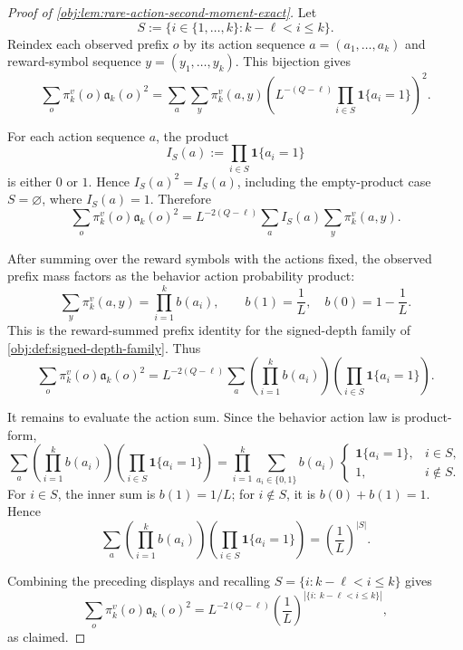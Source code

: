 \begin{proof}[Proof of \cref{obj:lem:rare-action-second-moment-exact}]
Let
\[
S:=\{i\in\{1,\ldots,k\}: k-\ell<i\le k\}.
\]
Reindex each observed prefix \(o\) by its action sequence \(a=(a_1,\ldots,a_k)\) and reward-symbol sequence \(y=(y_1,\ldots,y_k)\). This bijection gives
\[
\sum_o \pi_k^v(o)\mathfrak a_k(o)^2
=
\sum_a\sum_y
\pi_k^v(a,y)
\left(
L^{-(Q-\ell)}
\prod_{i\in S}\mathbf 1\{a_i=1\}
\right)^2 .
\]

For each action sequence \(a\), the product
\[
I_S(a):=\prod_{i\in S}\mathbf 1\{a_i=1\}
\]
is either \(0\) or \(1\). Hence \(I_S(a)^2=I_S(a)\), including the empty-product case \(S=\varnothing\), where \(I_S(a)=1\). Therefore
\[
\sum_o \pi_k^v(o)\mathfrak a_k(o)^2
=
L^{-2(Q-\ell)}
\sum_a I_S(a)\sum_y \pi_k^v(a,y).
\]

After summing over the reward symbols with the actions fixed, the observed prefix mass factors as the behavior action probability product:
\[
\sum_y \pi_k^v(a,y)
=
\prod_{i=1}^k b(a_i),
\qquad
b(1)=\frac1L,\quad b(0)=1-\frac1L .
\]
This is the reward-summed prefix identity for the signed-depth family of \cref{obj:def:signed-depth-family}. Thus
\[
\sum_o \pi_k^v(o)\mathfrak a_k(o)^2
=
L^{-2(Q-\ell)}
\sum_a
\left(\prod_{i=1}^k b(a_i)\right)
\left(\prod_{i\in S}\mathbf 1\{a_i=1\}\right).
\]

It remains to evaluate the action sum. Since the behavior action law is product-form,
\[
\sum_a
\left(\prod_{i=1}^k b(a_i)\right)
\left(\prod_{i\in S}\mathbf 1\{a_i=1\}\right)
=
\prod_{i=1}^k
\sum_{a_i\in\{0,1\}}
b(a_i)\,
\begin{cases}
\mathbf 1\{a_i=1\},& i\in S,\\
1,& i\notin S.
\end{cases}
\]
For \(i\in S\), the inner sum is \(b(1)=1/L\); for \(i\notin S\), it is \(b(0)+b(1)=1\). Hence
\[
\sum_a
\left(\prod_{i=1}^k b(a_i)\right)
\left(\prod_{i\in S}\mathbf 1\{a_i=1\}\right)
=
\left(\frac1L\right)^{|S|}.
\]

Combining the preceding displays and recalling
\(S=\{i:k-\ell<i\le k\}\) gives
\[
\sum_o \pi_k^v(o)\mathfrak a_k(o)^2
=
L^{-2(Q-\ell)}
\left(\frac1L\right)^{|\{i:\ k-\ell<i\le k\}|},
\]
as claimed.
\end{proof}
